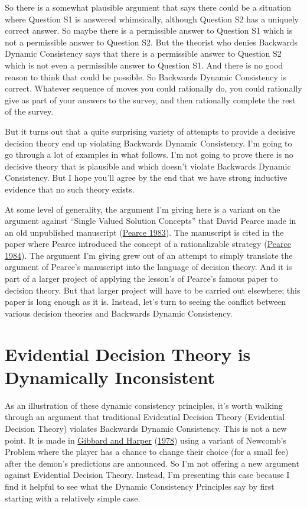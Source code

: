 \documentclass[
  12pt,
]{article}
\begin{document}
So there is a somewhat plausible argument that says there could be a
situation where Question S1 is answered whimsically, although Question
S2 has a uniquely correct answer. So maybe there is a permissible answer
to Question S1 which is not a permissible answer to Question S2. But the
theorist who denies Backwards Dynamic Consistency says that there is a
permissible answer to Question S2 which is not even a permissible answer
to Question S1. And there is no good reason to think that could be
possible. So Backwards Dynamic Consistency is correct. Whatever sequence
of moves you could rationally do, you could rationally give as part of
your answers to the survey, and then rationally complete the rest of the
survey.

But it turns out that a quite surprising variety of attempts to provide
a decisive decision theory end up violating Backwards Dynamic
Consistency. I'm going to go through a lot of examples in what follows.
I'm not going to prove there is no decisive theory that is plausible and
which doesn't violate Backwards Dynamic Consistency. But I hope you'll
agree by the end that we have strong inductive evidence that no such
theory exists.

At some level of generality, the argument I'm giving here is a variant
on the argument against ``Single Valued Solution Concepts'' that David
Pearce made in an old unpublished manuscript
(\protect\hyperlink{ref-Pearce1983}{Pearce 1983}). The manuscript is
cited in the paper where Pearce introduced the concept of a
rationalizable strategy (\protect\hyperlink{ref-Pearce1984}{Pearce
1984}). The argument I'm giving grew out of an attempt to simply
translate the argument of Pearce's manuscript into the language of
decision theory. And it is part of a larger project of applying the
lesson's of Pearce's famous paper to decision theory. But that larger
project will have to be carried out elsewhere; this paper is long enough
as it is. Instead, let's turn to seeing the conflict between various
decision theories and Backwards Dynamic Consistency.

\hypertarget{evidential-decision-theory-is-dynamically-inconsistent}{%
\section{Evidential Decision Theory is Dynamically
Inconsistent}\label{evidential-decision-theory-is-dynamically-inconsistent}}

As an illustration of these dynamic consistency principles, it's worth
walking through an argument that traditional Evidential Decision Theory
(Evidential Decision Theory) violates Backwards Dynamic Consistency.
This is not a new point. It is made in
\protect\hyperlink{ref-GibbardHarper1978}{Gibbard and Harper}
(\protect\hyperlink{ref-GibbardHarper1978}{1978}) using a variant of
Newcomb's Problem where the player has a chance to change their choice
(for a small fee) after the demon's predictions are announced. So I'm
not offering a new argument against Evidential Decision Theory. Instead,
I'm presenting this case because I find it helpful to see what the
Dynamic Consistency Principles say by first starting with a relatively
simple case.
\end{document}
